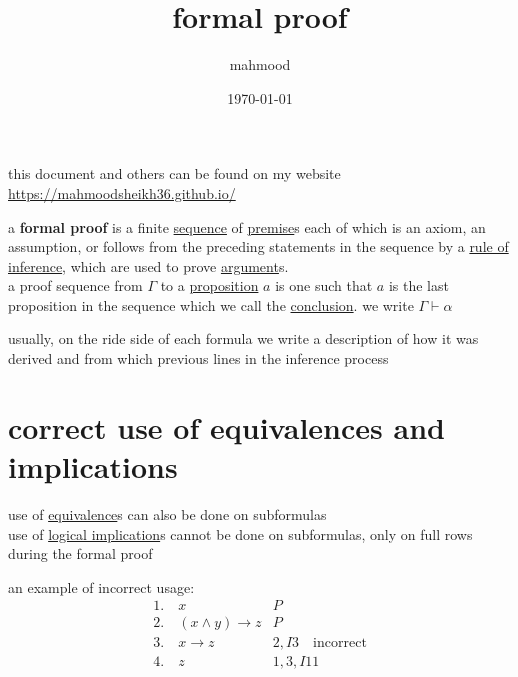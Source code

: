 \documentclass[a4paper,12pt]{article}
\author{mahmood}
\date{\today}
\title{formal proof}
\begin{document}
\maketitle
\begin{note}
this document and others can be found on my website\\
\url{https://mahmoodsheikh36.github.io/}
\end{note}
\begin{definition}
a \textbf{formal proof} is a finite \href{20220711175112-sequence.org}{sequence} of \href{20230524212241-premise.org}{premise}s each of which is an axiom, an assumption, or follows from the preceding statements in the sequence by a \href{20230524202636-rule_of_inference.org}{rule of inference}, which are used to prove \href{20230525215134-argument.org}{argument}s.\\
a proof sequence from \(\Gamma\) to a \href{20230401175139-statement.org}{proposition} \(a\) is one such that \(a\) is the last proposition in the sequence which we call the \href{20230524212250-conclusion.org}{conclusion}. we write \(\Gamma \vdash \alpha\)\\
\end{definition}
usually, on the ride side of each formula we write a description of how it was derived and from which previous lines in the inference process\\
\section{correct use of equivalences and implications}
\label{sec:orgd48ac7b}
use of \href{20230525090415-equivalence.org}{equivalence}s can also be done on subformulas\\
use of \href{20230525090605-logical_implication.org}{logical implication}s cannot be done on subformulas, only on full rows during the formal proof\\
\begin{my_example}
an example of incorrect usage:\\
\begin{align*}
  1.\ & x & P\\
  2.\ & (x \land y) \to z & P\\
  3.\ & x \to z & 2,I3 \quad \text{incorrect}\\
  4.\ & z & 1,3,I11
\end{align*}
\end{my_example}
\end{document}
